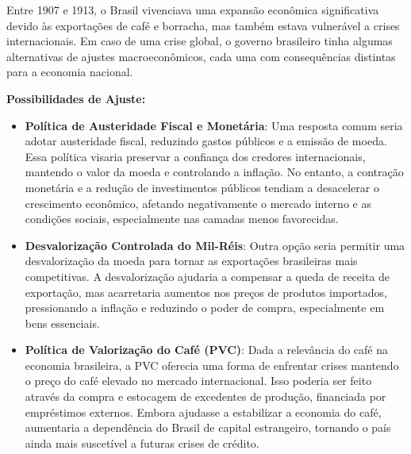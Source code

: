 \documentclass[a4paper,12pt]{article}[abntex2]
\begin{document}
Entre 1907 e 1913, o Brasil vivenciava uma expansão econômica significativa devido às exportações de café e borracha, mas também estava vulnerável a crises internacionais. Em caso de uma crise global, o governo brasileiro tinha algumas alternativas de ajustes macroeconômicos, cada uma com consequências distintas para a economia nacional.

\textbf{Possibilidades de Ajuste:}
\begin{itemize}
    \item \textbf{Política de Austeridade Fiscal e Monetária}: Uma resposta comum seria adotar austeridade fiscal, reduzindo gastos públicos e a emissão de moeda. Essa política visaria preservar a confiança dos credores internacionais, mantendo o valor da moeda e controlando a inflação. No entanto, a contração monetária e a redução de investimentos públicos tendiam a desacelerar o crescimento econômico, afetando negativamente o mercado interno e as condições sociais, especialmente nas camadas menos favorecidas.
    
    \item \textbf{Desvalorização Controlada do Mil-Réis}: Outra opção seria permitir uma desvalorização da moeda para tornar as exportações brasileiras mais competitivas. A desvalorização ajudaria a compensar a queda de receita de exportação, mas acarretaria aumentos nos preços de produtos importados, pressionando a inflação e reduzindo o poder de compra, especialmente em bens essenciais.

    \item \textbf{Política de Valorização do Café (PVC)}: Dada a relevância do café na economia brasileira, a PVC oferecia uma forma de enfrentar crises mantendo o preço do café elevado no mercado internacional. Isso poderia ser feito através da compra e estocagem de excedentes de produção, financiada por empréstimos externos. Embora ajudasse a estabilizar a economia do café, aumentaria a dependência do Brasil de capital estrangeiro, tornando o país ainda mais suscetível a futuras crises de crédito.
\end{itemize}
\end{document}
